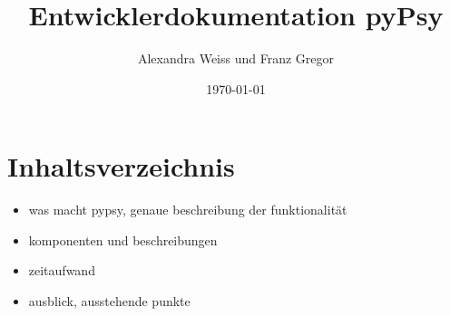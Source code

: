 \documentclass[a4paper,draft]{scrartcl}
\title{Entwicklerdokumentation pyPsy}
\author{Alexandra Weiss und Franz Gregor}
\date{\today}
\begin{document}
\maketitle

\section{Inhaltsverzeichnis}
\begin{itemize}
	\item was macht pypsy, genaue beschreibung der funktionalität
	\item komponenten und beschreibungen 
	\item zeitaufwand
	\item ausblick, ausstehende punkte
\end{itemize}
\newpage
\end{document}
